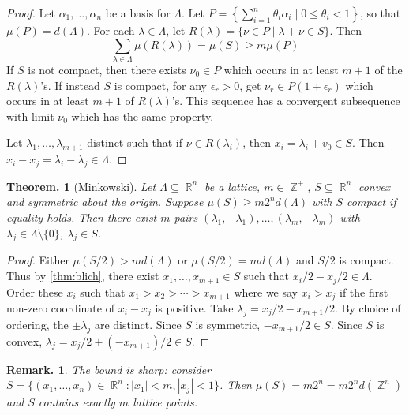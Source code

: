 \documentclass[11pt, a4paper]{memoir}
\DeclareMathOperator{\Z}{{\mathbb{Z}}}
\DeclareMathOperator{\R}{{\mathbb{R}}}
\theoremstyle{change}
\newtheorem{theorem}{Theorem.}[section]
\theoremstyle{plain}
\theoremstyle{nonumberplain}
\newtheorem{remark}{Remark.}
\newtheorem{proof}{Proof}
\numberwithin{equation}{section}
\begin{document}
\begin{proof}
    Let $\alpha_1,\ldots,\alpha_n$ be a basis for $\Lambda$.
    Let $P=\left\{\sum_{i=1}^n\theta_i\alpha_i\mid 0\leq\theta_i<1\right\}$, so that $\mu(P)=d(\Lambda)$.
    For each $\lambda\in\Lambda$, let $R(\lambda)=\{\nu\in P\mid\lambda+\nu\in S\}$.
    Then
    \begin{equation*}
        \sum_{\lambda\in\Lambda}\mu(R(\lambda))=\mu(S)\geq m\mu(P)
    \end{equation*}
    If $S$ is not compact, then there exists $\nu_0\in P$ which occurs in at least $m+1$ of the $R(\lambda)$'s.
    If instead $S$ is compact, for any $\epsilon_r>0$, get $\nu_r\in P(1+\epsilon_r)$ which occurs in at least $m+1$ of $R(\lambda)$'s.
    This sequence has a convergent subsequence with limit $\nu_0$ which has the same property.

    Let $\lambda_1,\ldots,\lambda_{m+1}$ distinct such that if $\nu\in R(\lambda_i)$, then $x_i=\lambda_i+v_0\in S$.
    Then $x_i-x_j=\lambda_i-\lambda_j\in\Lambda$.
\end{proof}
\begin{theorem}[Minkowski]\label{thm:mink}
    Let $\Lambda\subseteq\R^n$ be a lattice, $m\in\Z^+$, $S\subseteq\R^n$ convex and symmetric about the origin.
    Suppose $\mu(S)\geq m2^nd(\Lambda)$ with $S$ compact if equality holds.
    Then there exist $m$ pairs $(\lambda_1,-\lambda_1),\ldots,(\lambda_m,-\lambda_m)$ with $\lambda_j\in\Lambda\setminus\{0\}$, $\lambda_j\in S$.
\end{theorem}
\begin{proof}
    Either $\mu(S/2)>md(\Lambda)$ or $\mu(S/2)=md(\Lambda)$ and $S/2$ is compact.
    Thus by \cref{thm:blich}, there exist $x_1,\ldots,x_{m+1}\in S$ such that $x_i/2-x_j/2\in\Lambda$.
    Order these $x_i$ such that $x_1>x_2>\cdots>x_{m+1}$ where we say $x_i>x_j$ if the first non-zero coordinate of $x_i-x_j$ is positive.
    Take $\lambda_j=x_j/2-x_{m+1}/2$.
    By choice of ordering, the $\pm\lambda_j$ are distinct.
    Since $S$ is symmetric, $-x_{m+1}/2\in S$.
    Since $S$ is convex, $\lambda_j=x_j/2+(-x_{m+1})/2\in S$.
\end{proof}
\begin{remark}
    The bound is sharp: consider $S=\{(x_1,\ldots,x_n)\in\R^n:|x_1|<m,|x_j|<1\}$.
    Then $\mu(S)=m2^n=m2^nd(\Z^n)$ and $S$ contains exactly $m$ lattice points.
\end{remark}
\end{document}
